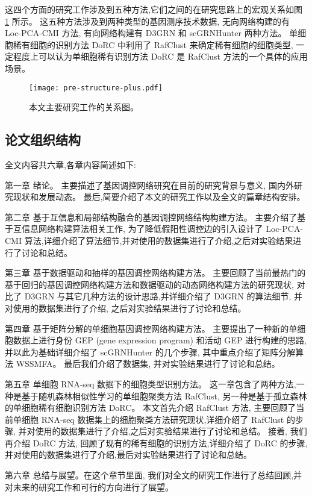 这四个方面的研究工作涉及到五种方法,它们之间的在研究思路上的宏观关系如图 \ref{fig:pre-structure} 所示。
这五种方法涉及到两种类型的基因测序技术数据, 无向网络构建的有 Loc-PCA-CMI 方法, 有向网络构建有 D3GRN 和 scGRNHunter 两种方法。 
单细胞稀有细胞的识别方法 DoRC 中利用了 RafClust 来确定稀有细胞的细胞类型,
一定程度上可以认为单细胞稀有识别方法 DoRC 是 RafClust 方法的一个具体的应用场景。
\begin{figure}[!htbp]
    \centering
    \texttt{[image: pre-structure-plus.pdf]}
    \caption{本文主要研究工作的关系图。}
    \label{fig:pre-structure}
\end{figure}

\subsection{论文组织结构}

全文内容共六章,各章内容简述如下:

第一章 绪论。
主要描述了基因调控网络研究在目前的研究背景与意义, 国内外研究现状和发展动态。
最后,简要介绍了本文的研究工作以及全文的篇章结构安排。

第二章 基于互信息和局部结构融合的基因调控网络结构构建方法。
主要介绍了基于互信息网络构建算法相关工作, 为了降低假阳性调控边的引入设计了 Loc-PCA-CMI 算法,详细介绍了算法细节,并对使用的数据集进行了介绍,之后对实验结果进行了讨论和总结。

第三章 基于数据驱动和抽样的基因调控网络构建方法。
主要回顾了当前最热门的基于回归的基因调控网络构建方法和数据驱动的动态网络构建方法的研究现状,
对比了 D3GRN 与其它几种方法的设计思路,并详细介绍了 D3GRN 的算法细节,
并对使用的数据集进行了介绍, 之后对实验结果进行了讨论和总结。

第四章 基于矩阵分解的单细胞基因调控网络构建方法。
主要提出了一种新的单细胞数据上进行身份 GEP (gene expression program) 和活动 
GEP 进行构建的思路, 并以此为基础详细介绍了 scGRNHunter 的几个步骤, 其中重点介绍了矩阵分解算法 WSSMFA。
最后我们介绍了数据集, 并对实验结果进行了讨论和总结。



第五章 单细胞 RNA-seq 数据下的细胞类型识别方法。
这一章包含了两种方法,一种是基于随机森林相似性学习的单细胞聚类方法 RafClust,
另一种是基于孤立森林的单细胞稀有细胞识别方法 DoRC。
本文首先介绍 RafClust 方法, 主要回顾了当前单细胞 RNA-seq 数据集上的细胞聚类方法研究现状,详细介绍了 RafClust 的步骤,
并对使用的数据集进行了介绍,之后对实验结果进行了讨论和总结。
接着, 我们再介绍 DoRC 方法, 回顾了现有的稀有细胞的识别方法,详细介绍了 DoRC 的步骤,
并对使用的数据集进行了介绍,最后对实验结果进行了讨论和总结。

第六章 总结与展望。在这个章节里面, 我们对全文的研究工作进行了总结回顾,并对未来的研究工作和可行的方向进行了展望。